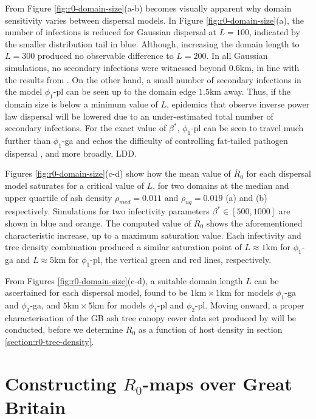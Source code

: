 From Figure \ref{fig:r0-domain-size}(a-b) becomes visually apparent why domain sensitivity varies between dispersal models.
In Figure \ref{fig:r0-domain-size}(a), the number of infections is reduced for Gaussian dispersal at $L=100$, indicated by the smaller distribution tail in blue.
Although, increasing the domain length to $L=300$ produced no observable difference to $L=200$.
In all Gaussian simulations, no secondary infections were witnessed beyond $0.6\mathrm{km}$, in line with the results from \cite{grosdidier2018tracking}. 
On the other hand, a small number of secondary infections in the model $\phi_1$-pl can be seen up to the domain edge $1.5\mathrm{km}$ away.
Thus, if the domain size is below a minimum value of $L$, epidemics that observe inverse power law dispersal will be lowered due to an under-estimated total number of secondary infections.
For the exact value of $\beta^*$, $\phi_1$-pl can be seen to travel much further than $\phi_1$-ga and echos the difficulty of controlling fat-tailed pathogen dispersal \cite{WEBIDEMICS}, and more broadly, LDD.

Figures \ref{fig:r0-domain-size}(c-d) show how the mean value of $\overline{R}_0$ for each dispersal model saturates for a critical value of $L$, 
for two domains at the median and upper quartile of ash density $\rho_{med}=0.011$ and $\rho_{uq}=0.019$ (a) and (b) respectively.
Simulations for two infectivity parameters $\beta^* \in [500, 1000]$ are shown in blue and orange.
The computed value of $\overline{R}_0$ shows the aforementioned characteristic increase, up to a maximum saturation value.
Each infectivity and tree density combination produced a similar saturation point of $L \approx 1\mathrm{km}$ for $\phi_1$-ga and $L\approx 5\mathrm{km}$ for $\phi_1$-pl, the vertical green and red lines, respectively. 

From Figures \ref{fig:r0-domain-size}(c-d), a suitable domain length $L$ can be ascertained for each dispersal model, 
found to be $\mathrm{1km\times1km}$ for models $\phi_1$-ga and $\phi_2$-ga, and $\mathrm{5km\times5km}$ for models $\phi_1$-pl and $\phi_2$-pl. 
Moving onward, a proper characterisation of the GB ash tree canopy cover data set produced by \cite{hill.data} will be conducted,
before we determine $R_0$ as a function of host density in section \ref{section:r0-tree-density}.

\section{Constructing $R_0$-maps over Great Britain}

